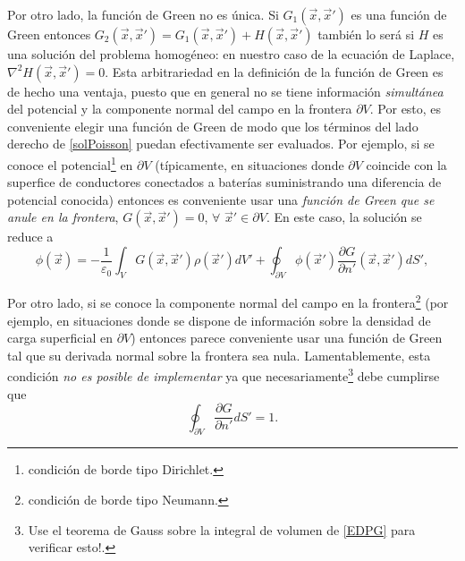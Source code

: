 Por otro lado, la función de Green no es única. Si $G_1(\vec{x},\vec{x}')$ es una función de Green entonces $G_2(\vec{x},\vec{x}')=G_1(\vec{x},\vec{x}')+H(\vec{x},\vec{x}')$ también lo será si $H$ es una solución del problema homogéneo: en nuestro caso de la ecuación de Laplace, $\nabla^2H(\vec{x},\vec{x}')=0$. Esta arbitrariedad en la definición de la función de Green es de hecho una ventaja, puesto que en general no se tiene información \textit{simultánea} del potencial y la componente normal del campo en la frontera $\partial V$. Por esto, es conveniente elegir una función de Green de modo que los términos del lado derecho de \eqref{solPoisson} puedan efectivamente ser evaluados. Por ejemplo, si se conoce el potencial\footnote{condición de borde tipo Dirichlet.} en $\partial V$ (típicamente, en situaciones donde $\partial V$ coincide con la superfice de conductores conectados a baterías suministrando una diferencia de potencial conocida) entonces es conveniente usar una \textit{función de Green que se anule en la frontera}, $G(\vec{x},\vec{x}')=0$, $\forall$ $\vec{x}'\in\partial V$. En este caso, la solución se reduce a
\begin{equation}\label{solPoissonDirichlet}
\phi(\vec{x})= -\frac{1}{\varepsilon_0}\int_VG(\vec{x},\vec{x}') \rho(\vec{x}')dV'+\oint_{\partial V}\phi(\vec{x}')\frac{\partial G}{\partial n'}(\vec{x},\vec{x}')dS',
\end{equation}

 Por otro lado, si se conoce la componente normal del campo en la frontera\footnote{condición de borde tipo Neumann.} (por ejemplo, en situaciones donde se dispone de información sobre la densidad de carga superficial en $\partial V$) entonces parece conveniente usar una función de Green tal que su derivada normal sobre la frontera sea nula. Lamentablemente, esta condición \textit{no es posible de implementar} ya que necesariamente\footnote{Use el teorema de Gauss sobre la integral de volumen de \eqref{EDPG} para verificar esto!.} debe cumplirse que
\begin{equation}\label{intGn}
\oint_{\partial V}\frac{\partial G}{\partial n'}dS'=1.
\end{equation}

